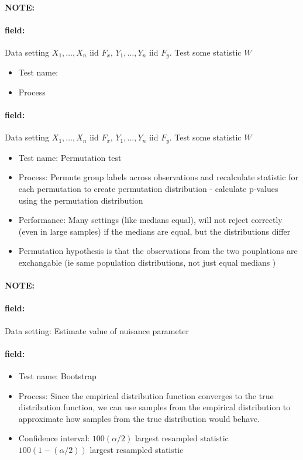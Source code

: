 \documentclass[12pt]{article}
\newenvironment{note}{\paragraph{NOTE:}}{}
\newenvironment{field}{\paragraph{field:}}{}
\begin{document}
\begin{note}
  \begin{field}
    Data setting $X_1, \ldots , X_n$ iid $F_x$, $Y_1, \ldots, Y_n$ iid $F_y$. Test some statistic $W$
    \begin{itemize}
      \item Test name:
      \item Process
    \end{itemize}
  \end{field}
  \begin{field}
    Data setting $X_1, \ldots , X_n$ iid $F_x$, $Y_1, \ldots, Y_n$ iid $F_y$. Test some statistic $W$
    \begin{itemize}
      \item Test name: Permutation test
      \item Process: Permute group labels across observations and recalculate statistic for each permutation to create permutation distribution - calculate p-values using the permutation distribution
      \item Performance: Many settings (like medians equal), will not reject correctly (even in large samples) if the medians are equal, but the distributions differ
      \item Permutation hypothesis is that the observations from the two pouplations are exchangable (ie same population distributions, not just equal medians )
    \end{itemize}
  \end{field}
\end{note}


\begin{note}
  \begin{field}
    Data setting: Estimate value of nuisance parameter
  \end{field}
  \begin{field}
    \begin{itemize}
      \item Test name: Bootstrap
      \item Process: Since the empirical distribution function converges to the true distribution function, we can use samples from the empirical distribution to approximate how samples from the true distribution would behave.
      \item Confidence interval: $100 (\alpha/2)$ largest resampled statistic $100(1 - (\alpha/2))$ largest resampled statistic
    \end{itemize}
  \end{field}
\end{note}
\end{document}
